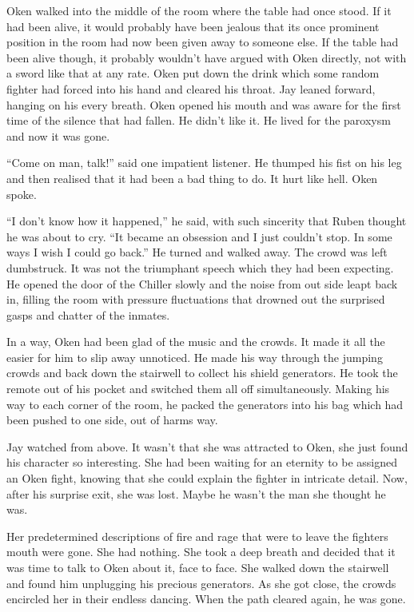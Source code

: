Oken walked into the middle of the room where the table had once stood.  If it had been alive, it would probably have been jealous that its once prominent position in the room had now been given away to someone else.  If the table had been alive though, it probably wouldn't have argued with Oken directly, not with a sword like that at any rate.   Oken put down the drink which some random fighter had forced into his hand and cleared his throat.  Jay leaned forward, hanging on his every breath.  Oken opened his mouth and was aware for the first time of the silence that had fallen.  He didn't like it.  He lived for the paroxysm and now it was gone.

``Come on man, talk!'' said one impatient listener.  He thumped his fist on his leg and then realised that it had been a bad thing to do.  It hurt like hell.  Oken spoke.

``I don't know how it happened,'' he said, with such sincerity that Ruben thought he was about to cry. ``It became an obsession and I just couldn't stop.  In some ways I wish I could go back.''  He turned and walked away.  The crowd was left dumbstruck.  It was not the triumphant speech which they had been expecting.   He opened the door of the Chiller slowly and the noise from out side leapt back in, filling the room with pressure fluctuations that drowned out the surprised gasps and chatter of the inmates.

In a way, Oken had been glad of the music and the crowds.  It made it all the easier for him to slip away unnoticed.  He made his way through the jumping crowds and back down the stairwell to collect his shield generators.  He took the remote out of his pocket and switched them all off simultaneously.  Making his way to each corner of the room, he packed the generators into his bag which had been pushed to one side, out of harms way.  

Jay watched from above.  It wasn't that she was attracted to Oken, she just found his character so interesting.  She had been waiting for an eternity to be assigned an Oken fight, knowing that she could explain the fighter in intricate detail.  Now, after his surprise exit, she was lost.  Maybe he wasn't the man she thought he was.

Her predetermined descriptions of fire and rage that were to leave the fighters mouth were gone.  She had nothing.  She took a deep breath and decided that it was time to talk to Oken about it, face to face.  She walked down the stairwell and found him unplugging his precious generators.  As she got close, the crowds encircled her in their endless dancing.  When the path cleared again, he was gone. 



